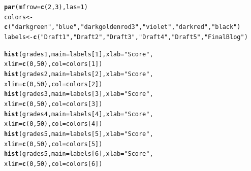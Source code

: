 \documentclass{article}\usepackage[]{graphicx}\usepackage[]{color}
\makeatletter
\newcommand{\hlnum}[1]{\textcolor[rgb]{0.686,0.059,0.569}{#1}}%
\newcommand{\hlstr}[1]{\textcolor[rgb]{0.192,0.494,0.8}{#1}}%
\newcommand{\hlstd}[1]{\textcolor[rgb]{0.345,0.345,0.345}{#1}}%
\newcommand{\hlkwb}[1]{\textcolor[rgb]{0.69,0.353,0.396}{#1}}%
\newcommand{\hlkwc}[1]{\textcolor[rgb]{0.333,0.667,0.333}{#1}}%
\newcommand{\hlkwd}[1]{\textcolor[rgb]{0.737,0.353,0.396}{\textbf{#1}}}%
\newenvironment{kframe}{%
 \def\at@end@of@kframe{}%
 \ifinner\ifhmode%
  \def\at@end@of@kframe{\end{minipage}}%
  \begin{minipage}{\columnwidth}%
 \fi\fi%
 \def\FrameCommand##1{\hskip\@totalleftmargin \hskip-\fboxsep
 \colorbox{shadecolor}{##1}\hskip-\fboxsep
     \hskip-\linewidth \hskip-\@totalleftmargin \hskip\columnwidth}%
 \MakeFramed {\advance\hsize-\width
   \@totalleftmargin\z@ \linewidth\hsize
   \@setminipage}}%
 {\par\unskip\endMakeFramed%
 \at@end@of@kframe}
\newenvironment{knitrout}{}{} %
\makeatother
\begin{document}
\bigskip
\begin{knitrout}
\color{fgcolor}\begin{kframe}
\begin{alltt}
\hlkwd{par}\hlstd{(}\hlkwc{mfrow}\hlstd{=}\hlkwd{c}\hlstd{(}\hlnum{2}\hlstd{,}\hlnum{3}\hlstd{),} \hlkwc{las}\hlstd{=}\hlnum{1}\hlstd{)}
\hlstd{colors} \hlkwb{<-} \hlkwd{c}\hlstd{(}\hlstr{"darkgreen"}\hlstd{,} \hlstr{"blue"}\hlstd{,} \hlstr{"darkgoldenrod3"}\hlstd{,} \hlstr{"violet"}\hlstd{,} \hlstr{"darkred"}\hlstd{,} \hlstr{"black"}\hlstd{)}
\hlstd{labels} \hlkwb{<-} \hlkwd{c}\hlstd{(}\hlstr{"Draft 1"}\hlstd{,} \hlstr{"Draft 2"}\hlstd{,} \hlstr{"Draft 3"}\hlstd{,} \hlstr{"Draft 4"}\hlstd{,} \hlstr{"Draft 5"}\hlstd{,} \hlstr{"Final Blog"}\hlstd{)}


\hlkwd{hist}\hlstd{(grades1,} \hlkwc{main}\hlstd{=labels[}\hlnum{1}\hlstd{],} \hlkwc{xlab}\hlstd{=}\hlstr{"Score"}\hlstd{,}
     \hlkwc{xlim}\hlstd{=}\hlkwd{c}\hlstd{(}\hlnum{0}\hlstd{,}\hlnum{50}\hlstd{),} \hlkwc{col}\hlstd{=colors[}\hlnum{1}\hlstd{])}
\hlkwd{hist}\hlstd{(grades2,} \hlkwc{main}\hlstd{=labels[}\hlnum{2}\hlstd{],} \hlkwc{xlab}\hlstd{=}\hlstr{"Score"}\hlstd{,}
     \hlkwc{xlim}\hlstd{=}\hlkwd{c}\hlstd{(}\hlnum{0}\hlstd{,}\hlnum{50}\hlstd{),} \hlkwc{col}\hlstd{=colors[}\hlnum{2}\hlstd{])}
\hlkwd{hist}\hlstd{(grades3,} \hlkwc{main}\hlstd{=labels[}\hlnum{3}\hlstd{],} \hlkwc{xlab}\hlstd{=}\hlstr{"Score"}\hlstd{,}
     \hlkwc{xlim}\hlstd{=}\hlkwd{c}\hlstd{(}\hlnum{0}\hlstd{,}\hlnum{50}\hlstd{),} \hlkwc{col}\hlstd{=colors[}\hlnum{3}\hlstd{])}
\hlkwd{hist}\hlstd{(grades4,} \hlkwc{main}\hlstd{=labels[}\hlnum{4}\hlstd{],} \hlkwc{xlab}\hlstd{=}\hlstr{"Score"}\hlstd{,}
     \hlkwc{xlim}\hlstd{=}\hlkwd{c}\hlstd{(}\hlnum{0}\hlstd{,}\hlnum{50}\hlstd{),} \hlkwc{col}\hlstd{=colors[}\hlnum{4}\hlstd{])}
\hlkwd{hist}\hlstd{(grades5,} \hlkwc{main}\hlstd{=labels[}\hlnum{5}\hlstd{],} \hlkwc{xlab}\hlstd{=}\hlstr{"Score"}\hlstd{,}
     \hlkwc{xlim}\hlstd{=}\hlkwd{c}\hlstd{(}\hlnum{0}\hlstd{,}\hlnum{50}\hlstd{),} \hlkwc{col}\hlstd{=colors[}\hlnum{5}\hlstd{])}
\hlkwd{hist}\hlstd{(grades5,} \hlkwc{main}\hlstd{=labels[}\hlnum{6}\hlstd{],} \hlkwc{xlab}\hlstd{=}\hlstr{"Score"}\hlstd{,}
     \hlkwc{xlim}\hlstd{=}\hlkwd{c}\hlstd{(}\hlnum{0}\hlstd{,}\hlnum{50}\hlstd{),} \hlkwc{col}\hlstd{=colors[}\hlnum{6}\hlstd{])}
\end{alltt}
\end{kframe}\begin{figure}

\end{figure}
\end{knitrout}
\end{document}
